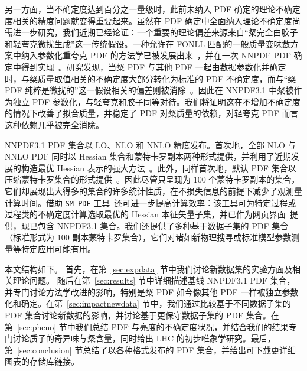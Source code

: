 另一方面，当不确定度达到百分之一量级时，此前未纳入 PDF 确定的理论不确定度相关的精度问题就变得重要起来。虽然在 PDF 确定中全面纳入理论不确定度尚需进一步研究，我们近期已经论证：一个重要的理论偏差来源来自“粲完全由胶子和轻夸克微扰生成”这一传统假设。一种允许在 FONLL 匹配的一般质量变味数方案中纳入参数化重夸克 PDF 的方法学已被发展出来~\cite{Ball:2015tna,Ball:2015dpa}，并在一次 NNPDF PDF 确定中得到实现~\cite{Ball:2016neh}。研究发现，当粲 PDF 与其他 PDF 一起由数据参数化并确定时，与粲质量取值相关的不确定度大部分转化为标准的 PDF 不确定度，而与“粲 PDF 纯粹是微扰的”这一假设相关的偏差则被消除~\cite{Ball:2016neh}。因此在 NNPDF3.1 中粲被作为独立 PDF 参数化，与轻夸克和胶子同等对待。我们将证明这在不增加不确定度的情况下改善了拟合质量，并稳定了 PDF 对粲质量的依赖，对轻夸克 PDF 而言这种依赖几乎被完全消除。

NNPDF3.1 PDF 集合以 LO、NLO 和 NNLO 精度发布。首次地，全部 NLO 与 NNLO PDF 同时以 Hessian 集合和蒙特卡罗副本两种形式提供，并利用了近期发展的构造最优 Hessian 表示的强大方法~\cite{Carrazza:2015aoa}。此外，同样首次地，默认 PDF 集合以压缩蒙特卡罗集合的形式提供~\cite{Carrazza:2015hva}。因此尽管只呈现为 100 个蒙特卡罗副本的集合，它们却展现出大得多的集合的许多统计性质，在不损失信息的前提下减少了观测量计算时间。借助 {\tt SM-PDF} 工具~\cite{Carrazza:2016htc}还可进一步提高计算效率：该工具可为特定过程或过程类的不确定度计算选取最优的 Hessian 本征矢量子集，并已作为网页界面~\cite{Carrazza:2016wte}提供，现已包含 NNPDF3.1 集合。我们还提供了多种基于数据子集的 PDF 集合（标准形式为 100 副本蒙特卡罗集合），它们对诸如新物理搜寻或标准模型参数测量等特定应用可能有用。

本文结构如下。
%
首先，在第~\ref{sec:expdata} 节中我们讨论新数据集的实验方面及相关理论问题。
随后在第~\ref{sec:results} 节中详细描述基线 NNPDF3.1 PDF 集合，并专门讨论方法学改进的影响，特别是粲 PDF 如今像其他 PDF 一样被独立参数化和确定。在第~\ref{sec:impactnewdata} 节中，我们通过比较基于不同数据子集的 PDF 集合讨论新数据的影响，并讨论基于更保守数据子集的 PDF 集合。在第~\ref{sec:pheno} 节中我们总结 PDF 与亮度的不确定度状况，并结合我们的结果专门讨论质子的奇异味与粲含量，同时给出 LHC 的初步唯象学研究。最后，第~\ref{sec:conclusion} 节总结了以各种格式发布的 PDF 集合，并给出可下载更详细图表的存储库链接。

